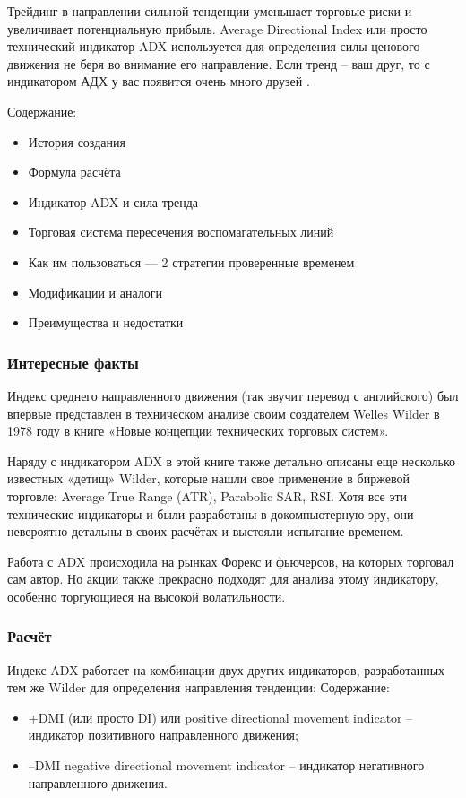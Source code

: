 \documentclass[a5paper]{article}
\begin{document}
Трейдинг в направлении сильной тенденции уменьшает торговые риски и увеличивает потенциальную прибыль. Average Directional Index или просто технический индикатор ADX используется для определения силы ценового движения не беря во внимание его направление. Если тренд – ваш друг, то с индикатором АДХ у вас появится очень много друзей .

    Содержание:
\begin{itemize}
\item         История создания
\item         Формула расчёта
\item         Индикатор ADX и сила тренда
\item         Торговая система пересечения воспомагательных линий
\item         Как им пользоваться — 2 стратегии проверенные временем
\item         Модификации и аналоги
\item         Преимущества и недостатки
\end{itemize}

\subsubsection{Интересные факты}

Индекс среднего направленного движения (так звучит перевод с английского) был впервые представлен в техническом анализе своим создателем Welles Wilder в 1978 году в книге «Новые концепции технических торговых систем».

Наряду с индикатором ADX в этой книге также детально описаны еще несколько известных «детищ» Wilder, которые нашли свое применение в биржевой торговле: Average True Range (ATR), Parabolic SAR, RSI. Хотя все эти технические индикаторы и были разработаны в докомпьютерную эру, они невероятно детальны в своих расчётах и выстояли испытание временем.

Работа с ADX происходила на рынках Форекс и фьючерсов, на которых
торговал сам автор. Но акции также прекрасно подходят для анализа
этому индикатору, особенно торгующиеся на высокой волатильности.

\subsubsection{Расчёт}

Индекс ADX работает на комбинации двух других индикаторов, разработанных тем же Wilder для определения направления тенденции:
    Содержание:
\begin{itemize}
\item     +DMI (или просто DI) или positive directional movement indicator – индикатор позитивного направленного движения;
\item     –DMI negative directional movement indicator – индикатор негативного направленного движения.
\end{itemize}
\end{document}

